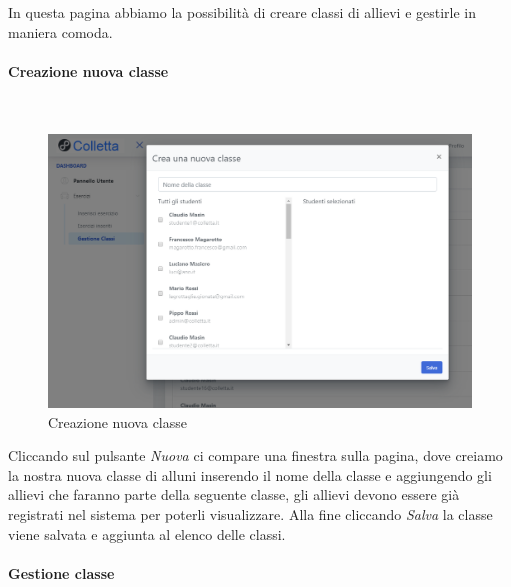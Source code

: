         In questa pagina abbiamo la possibilità di creare classi di allievi e gestirle  in maniera comoda. 

\paragraph{Creazione nuova classe}\mbox{}\\         

\begin{figure}[H]
            	\centering
        		\includegraphics[width=17cm]{sez/img/insegnante/creanuovaclasse.PNG} 
            	\caption{Creazione nuova classe}\label{fig:1}
        	\end{figure}            	

Cliccando sul pulsante  \textit{Nuova} ci compare una finestra sulla pagina, dove creiamo la nostra nuova classe di alluni inserendo il nome della classe e aggiungendo gli allievi che faranno parte della seguente classe, gli allievi devono essere già registrati nel sistema per poterli visualizzare. Alla fine cliccando \textit{Salva} la classe viene salvata e aggiunta al elenco delle classi.
 
 \paragraph{Gestione classe}\mbox{}\\
 
